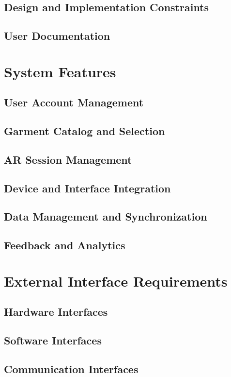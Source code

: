 \documentclass{scrreprt}
\begin{document}
\section{Design and Implementation Constraints}
\section{User Documentation}

\chapter{System Features}

\section{User Account Management}
\section{Garment Catalog and Selection}
\section{AR Session Management}
\section{Device and Interface Integration}
\section{Data Management and Synchronization}
\section{Feedback and Analytics}

\chapter{External Interface Requirements}

\section{Hardware Interfaces}
\section{Software Interfaces}
\section{Communication Interfaces}
\end{document}
